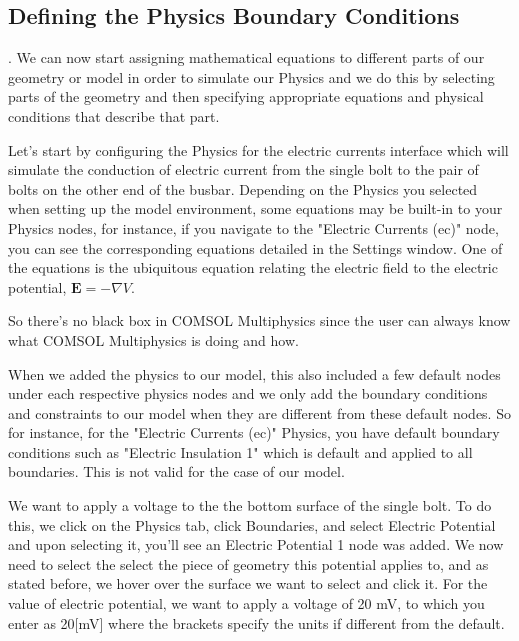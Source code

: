 \subsection{Defining the Physics Boundary Conditions}.
We can now start assigning mathematical equations to different parts of our geometry or model in order to simulate our Physics and we do this by selecting parts of the geometry and then specifying appropriate equations and physical conditions that describe that part.

Let's start by configuring the Physics for the electric currents interface which will simulate the conduction of electric current from the single bolt to the pair of bolts on the other end of the busbar. Depending on the Physics you selected when setting up the model environment, some equations may be built-in to your Physics nodes, for instance, if you navigate to the "Electric Currents (ec)" node, you can see the corresponding equations detailed in the Settings window. One of the equations is the ubiquitous equation relating the electric field to the electric potential, $\mathbf{E} = -\nabla V$.


So there's no black box in COMSOL Multiphysics since the user can always know what COMSOL Multiphysics is doing and how.

When we added the physics to our model, this also included a few default nodes under each respective physics nodes and we only add the boundary conditions and constraints to our model when they are different from these default nodes. So for instance, for the "Electric Currents (ec)" Physics, you have default boundary conditions such as "Electric Insulation 1" which is default and applied to all boundaries. This is not valid for the case of our model.

We want to apply a voltage to the the bottom surface of the single bolt. To do this, we click on the Physics tab, click Boundaries, and select Electric Potential and upon selecting it, you'll see an Electric Potential 1 node was added. We now need to select the select the piece of geometry this potential applies to, and as stated before, we hover over the surface we want to select and click it. For the value of electric potential, we want to apply a voltage of 20 mV, to which you enter as 20[mV] where the brackets specify the units if different from the default.

